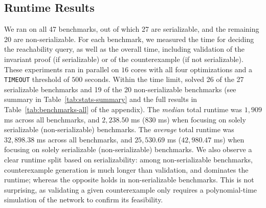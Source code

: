 \subsection{Runtime Results}
We ran \toolname{} on all 47 benchmarks, out of which 27 are serializable, and the remaining 20 are non-serializable. 
For each benchmark, we measured the time for deciding the reachability query, as well as the overall time, including validation of the invariant proof (if serializable) or of the counterexample (if not serializable). These experiments ran in parallel on $16$ cores with all four optimizations and a \texttt{TIMEOUT} threshold of $500$ seconds.
%
Within the time limit, \toolname{} solved 26 of the 27 serializable benchmarks and 19 of the 20 non-serializable benchmarks (see summary in Table~\ref{tab:stats-summary} and the full results in Table~\ref{tab:benchmarks-all} of the appendix).
%
%
The \textit{median} total runtime was $1{,}909$ ms across all benchmarks, and $2{,}238.50$ ms ($830$ ms) when focusing on solely serializable (non-serializable) benchmarks.
%
The \textit{average} total runtime was $32{,}898.38$ ms across all benchmarks, and $25{,}530.69$ ms ($42{,}980.47$ ms) when focusing on solely serializable (non-serializable) benchmarks.
%
We also observe a clear runtime split based on serializability: 
among non-serializable benchmarks, counterexample generation is much longer than validation, and dominates the runtime; whereas the opposite holds in non-serializable benchmarks. This is not surprising, as validating a given counterexample only requires a polynomial-time simulation of the network to confirm its feasibility.
%
%


